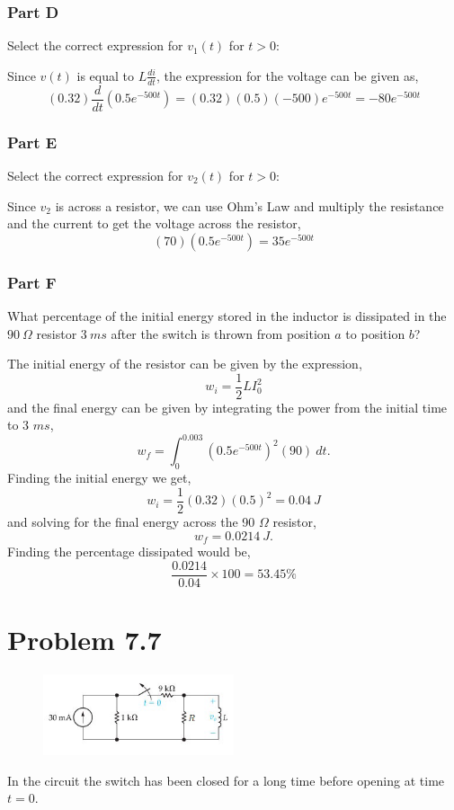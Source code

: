 \documentclass[12pt]{article}
\begin{document}
    \subsubsection*{Part D} Select the correct expression for $v_1(t)$ for $t > 0$: \\
    \par Since $v(t)$ is equal to $L\frac{di}{dt}$, the expression for the voltage can be given as,
    \[
        (0.32) \frac{d}{dt} \left( 0.5e^{-500t} \right) =
        (0.32)(0.5)(-500)e^{-500t} = \boxed{-80e^{-500t}}
    \]
    \subsubsection*{Part E} Select the correct expression for $v_2(t)$ for $t > 0$: \\
    \par Since $v_2$ is across a resistor, we can use Ohm's Law and multiply the resistance and the current to get the voltage across the resistor,
    \[
        (70)(0.5e^{-500t}) = \boxed{35e^{-500t}}
    \]
    \subsubsection*{Part F} What percentage of the initial energy stored in the inductor is dissipated in the $90\ \Omega$ resistor $3\ ms$ after the switch is thrown from position $a$ to position $b$? \\
    \par The initial energy of the resistor can be given by the expression,
    \[
        w_{i} = \frac{1}{2} L I_0^2
    \]
    and the final energy can be given by integrating the power from the initial time to 3 $ms$,
    \[
        w_{f} = \int_0^{0.003} \left( 0.5e^{-500t} \right)^2 (90)\ dt.
    \]
    Finding the initial energy we get,
    \[
        w_i = \frac{1}{2} (0.32) (0.5)^2 = 0.04\ J
    \]
    and solving for the final energy across the 90 $\Omega$ resistor,
    \[
        w_f = 0.0214\ J.
    \]
    Finding the percentage dissipated would be,
    \[
        \frac{0.0214}{0.04} \times 100 = \boxed{53.45\%}
    \]
    \newpage
    \section*{Problem 7.7}
    \begin{figure}[h]
        \centering
        \includegraphics[width=0.5\textwidth]{7.7 Figure.png}
    \end{figure}
    \par In the circuit the switch has been closed for a long time before opening at time $t = 0$.
\end{document}
